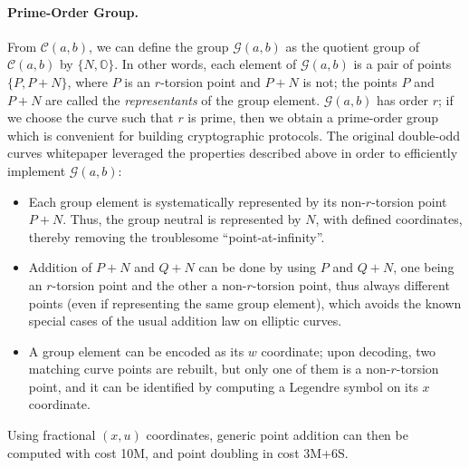 \documentclass{llncs}
\newcommand{\cC}{\mathcal{C}}
\newcommand{\cG}{\mathcal{G}}
\newcommand{\neutral}{\mathbb{O}}
\begin{document}
\paragraph{Prime-Order Group.}
From $\cC(a,b)$, we can define the group $\cG(a,b)$ as the quotient
group of $\cC(a,b)$ by $\{N,\neutral\}$. In other words, each element of
$\cG(a,b)$ is a pair of points $\{P,P+N\}$, where $P$ is an $r$-torsion
point and $P+N$ is not; the points $P$ and $P+N$ are called the
\emph{representants} of the group element. $\cG(a,b)$ has order $r$;
if we choose the curve such that $r$ is prime, then we obtain a prime-order
group which is convenient for building cryptographic protocols. The
original double-odd curves whitepaper\cite{Por2020-5} leveraged the
properties described above in order to efficiently implement $\cG(a,b)$:
\begin{itemize}
    \item Each group element is systematically represented by its
    non-$r$-torsion point $P+N$. Thus, the group neutral is represented
    by $N$, with defined coordinates, thereby removing the troublesome
    ``point-at-infinity''.
    \item Addition of $P+N$ and $Q+N$ can be done by using $P$ and $Q+N$,
    one being an $r$-torsion point and the other a non-$r$-torsion point,
    thus always different points (even if representing the same group
    element), which avoids the known special cases of the usual addition
    law on elliptic curves.
    \item A group element can be encoded as its $w$ coordinate; upon
    decoding, two matching curve points are rebuilt, but only one of them
    is a non-$r$-torsion point, and it can be identified by computing a
    Legendre symbol on its $x$ coordinate.
\end{itemize}
Using fractional $(x,u)$ coordinates, generic point addition can then be
computed with cost 10M, and point doubling in cost 3M+6S.
\end{document}
